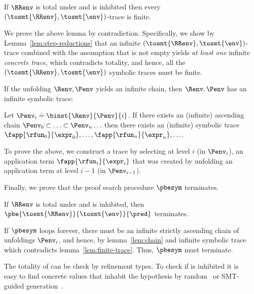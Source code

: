 \begin{lemma}\label{lem:finite-trace}
If $\RRenv$ is total under \env and \env is inhibited
then every $(\tosmt{\RRenv},\tosmt{\env})$-trace is finite.
\end{lemma}

We prove the above lemma by contradiction.
Specifically, we show by Lemma~\ref{lem:step-reductions} that an infinite
$(\tosmt{\RRenv},\tosmt{\env})$-trace 
combined with the assumption that \embed{\env} is not empty  
yields \textit{at least one}
infinite \emph{concrete trace}, which
contradicts totality, and hence, all the
$(\tosmt{\RRenv},\tosmt{\env})$ symbolic traces
must be finite.

%
If the unfolding $\Renv, \Penv$ yields
an infinite chain, then $\Renv, \Penv$
has an infinite symbolic trace:

\begin{lemma}  \label{lem:chain}
Let $\Penv_i \doteq \binst{\Renv}{\Penv}{i}$.
If there exists an (infinite) ascending chain
$\Penv_0 \subset \ldots \subset \Penv_n \ldots$
then there exists an (infinite) symbolic trace
$\fapp{\rfun_0}{\expr_0},\ldots,\fapp{\rfun_n}{\expr_n},\ldots$.
\end{lemma}

To prove the above,
we construct a trace
by selecting at level $i$
(\ie in $\Penv_i$),
an application term
$\fapp{\rfun_i}{\expr_i}$
that was created by
unfolding an application
term at level $i-1$
(\ie in $\Penv_{i-1}$).



%
Finally, we prove that the proof search
procedure $\pbesym$ terminates.

\begin{theorem} \label{thm:termination}
  If $\RRenv$ is total under \env and \env is inhibited, 
  then $\pbe{\tosmt{\RRenv}}{\tosmt{\env}}{\pred}$ terminates.
\end{theorem}

If $\pbesym$ loops forever,
there must be an infinite strictly ascending chain of
unfoldings $\Penv_i$, and hence, by lemma~\ref{lem:chain}
and infinite symbolic trace which contradicts
lemma~\ref{lem:finite-trace}.
%
Thus, $\pbesym$ must terminate.

The totality of \RRenv can be check by refinement types. 
To check if \env is inhibited 
it is easy to find concrete values that inhabit
the hypothesis by random~\cite{Claessen00}
or SMT-guided generation~\cite{Seidel15}.
